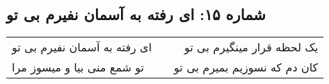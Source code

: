 \begin{center}
\section*{شماره ۱۵: ای رفته به آسمان نفیرم بی تو}
\label{sec:015}
\begin{longtable}{l p{0.5cm} r}
ای رفته به آسمان نفیرم بی تو
&&
یک لحظه قرار مینگیرم بی تو
\\
تو شمع منی بیا و میسوز مرا
&&
کان دم که نسوزیم بمیرم بی تو
\\
\end{longtable}
\end{center}
